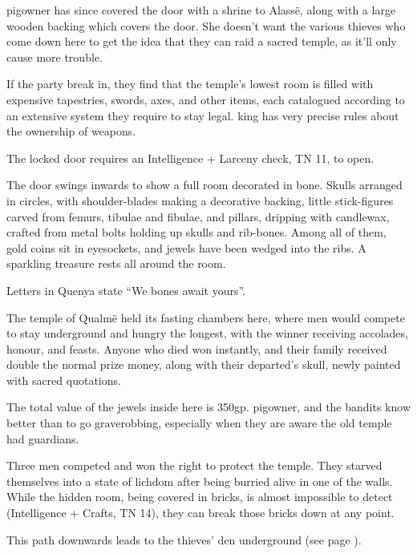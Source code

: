 \begin{multicols}{2}
\Gls{pigowner} has since covered the door with a shrine to Alass\"{e}, along with a large wooden backing which covers the door.  She doesn't want the various thieves who come down here to get the idea that they can raid a sacred temple, as it'll only cause more trouble.

If the party break in, they find that the temple's lowest room is filled with expensive tapestries, swords, axes, and other items, each catalogued according to an extensive system they require to stay legal.  \Gls{king} has very precise rules about the ownership of weapons.

The locked door requires an Intelligence + Larceny check, TN 11, to open.

\begin{boxtext}
	The door swings inwards to show a full room decorated in bone.  Skulls arranged in circles, with shoulder-blades making a decorative backing, little stick-figures carved from femurs, tibulae and fibulae, and pillars, dripping with candlewax, crafted from metal bolts holding up skulls and rib-bones.  Among all of them, gold coins sit in eyesockets, and jewels have been wedged into the ribs.  A sparkling treasure rests all around the room.

	Letters in Quenya state ``We bones await yours''.
\end{boxtext}

The temple of Qualm\"{e} held its fasting chambers here, where men would compete to stay underground and hungry the longest, with the winner receiving accolades, honour, and feasts.  Anyone who died won instantly, and their family received double the normal prize money, along with their departed's skull, newly painted with sacred quotations.

The total value of the jewels inside here is 350gp.  \Gls{pigowner}, and the bandits know better than to go graverobbing, especially when they are aware the old temple had guardians.


Three men competed and won the right to protect the temple.  They starved themselves into a state of lichdom after being burried alive in one of the walls.  While the hidden room, being covered in bricks, is almost impossible to detect (Intelligence + Crafts, TN 14), they can break those bricks down at any point.

\demilich

This path downwards leads to the thieves' den underground (see page \pageref{pigexit}).

\end{multicols}

